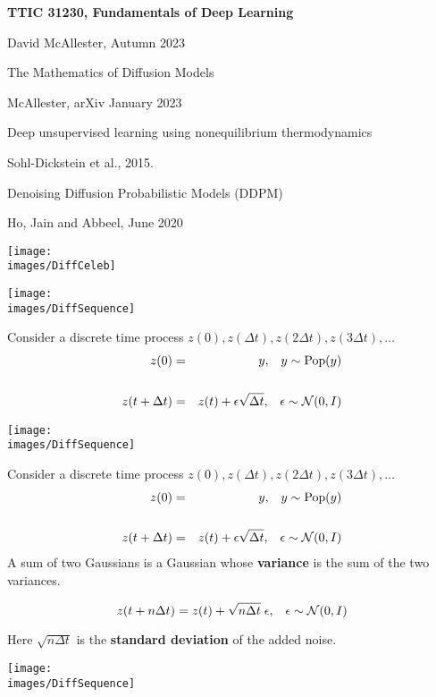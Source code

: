 





{\Huge

  \centerline{\bf TTIC 31230, Fundamentals of Deep Learning}
  \bigskip
  \centerline{David McAllester, Autumn 2023}
  \vfill
  \vfil
  \centerline{The Mathematics of Diffusion Models}
  \vfill
  \centerline{McAllester, arXiv January 2023}
    \vfill
  \vfill


\centerline{Deep unsupervised learning using nonequilibrium thermodynamics}
\centerline{Sohl-Dickstein et al., 2015.}

\vfill
\centerline{Denoising Diffusion Probabilistic Models (DDPM)}
\centerline{Ho, Jain and Abbeel, June 2020}


\vfill
\centerline{\texttt{[image: \\images/DiffCeleb]}}

\centerline{\texttt{[image: \\images/DiffSequence]}}

\vfill
Consider a discrete time process $z(0),z(\Delta t),z(2\Delta t),z(3\Delta t),\ldots$
{\huge
\begin{eqnarray*}
  z(0) & = & y,\;\;\;y \sim \mathrm{Pop}(y) \\
  \\
  z(t+\Delta t) & = & z(t) + \epsilon\sqrt{\Delta t},\;\;\;\epsilon \sim {\cal N}(0,I)
\end{eqnarray*}
}

\centerline{\texttt{[image: \\images/DiffSequence]}}

Consider a discrete time process $z(0),z(\Delta t),z(2\Delta t),z(3\Delta t),\ldots$
{\huge
\begin{eqnarray*}
  z(0) & = & y,\;\;\;y \sim \mathrm{Pop}(y) \\
  \\
  z(t+\Delta t) & = & z(t) + \epsilon\sqrt{\Delta t},\;\;\;\epsilon \sim {\cal N}(0,I)
\end{eqnarray*}
}
A sum of two Gaussians is a Gaussian whose {\bf variance} is the sum of the two variances.

\vfill
$$z(t+n\Delta t) = z(t) + \sqrt{n\Delta t}\; \epsilon,\;\;\;\epsilon \sim {\cal N}(0,I)$$

\vfill
Here $\sqrt{n \Delta t}$ is the {\bf standard deviation} of the added noise.



\centerline{\texttt{[image: \\images/DiffSequence]}}

}
